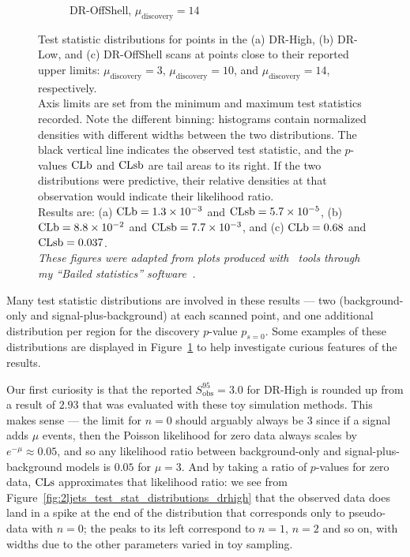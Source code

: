 \begin{figure}[tp]
\begin{subfigure}{0.46\textwidth}
\caption{DR-OffShell, $\mu_\textrm{discovery}=14$}
\end{subfigure}
\caption[
Test statistic distributions for points in the DR-High and DR-Low scans
]{%
Test statistic distributions for points in the (a) DR-High, (b) DR-Low,
and (c) DR-OffShell scans at points close to their reported upper limits:
$\mu_\textrm{discovery}=3$, $\mu_\textrm{discovery}=10$,
and $\mu_\textrm{discovery}=14$, respectively.
\\[0.5em]
Axis limits are set from the minimum and maximum test statistics recorded.
Note the different binning: histograms contain normalized densities with
different widths between the two distributions.
The black vertical line indicates the observed test statistic,
and the $p$-values $\mathrm{CLb}$ and $\mathrm{CLsb}$ are tail areas to its right.
If the two distributions were predictive, their relative densities at that
observation would indicate their likelihood ratio.
\\[0.5em]
Results are:
(a) $\mathrm{CLb} = 1.3\times 10^{-3}$ and $\mathrm{CLsb} = 5.7\times 10^{-5}$,
(b) $\mathrm{CLb} = 8.8\times 10^{-2}$ and $\mathrm{CLsb} = 7.7\times 10^{-3}$,
and (c) $\mathrm{CLb} = 0.68$ and $\mathrm{CLsb} = 0.037$.
\\[0.5em]
\emph{These figures were adapted from plots produced with \histfitter\ tools
through my ``Bailed statistics'' software~\cite{bailedstatisticsgithub}.}
}
\label{fig:2ljets_test_stat_distributions}
\end{figure}

Many test statistic distributions are involved in these results ---
two (background-only and signal-plus-background) at each scanned point,
and one additional distribution per region for the discovery
$p$-value $p_{s\!=\!0}$.
Some examples of these distributions are displayed in
Figure~\ref{fig:2ljets_test_stat_distributions}
to help investigate curious features of the results.

Our first curiosity is that the reported $S_{\mathrm{obs}}^{95} = 3.0$
for DR-High is rounded up from a result of $2.93$ that was evaluated with these
toy simulation methods.
This makes sense --- the limit for $n=0$ should arguably always be $3$ since
if a signal adds $\mu$ events, then the Poisson likelihood for zero data always
scales by $e^{-\mu} \approx 0.05$, and so any likelihood ratio between
background-only and signal-plus-background models is $0.05$ for $\mu = 3$.
And by taking a ratio of $p$-values for zero data, $\mathrm{CLs}$ approximates that
likelihood ratio:
we see from Figure~\ref{fig:2ljets_test_stat_distributions_drhigh} that the
observed data does land in a spike at the end of the distribution that
corresponds only to pseudo-data with $n=0$; the peaks to its left correspond
to $n=1$, $n=2$ and so on, with widths due to the other parameters varied in
toy sampling.


